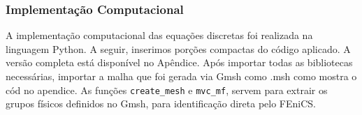 \subsubsection{Implementação Computacional}


A implementação computacional das equações discretas foi realizada na linguagem Python. A seguir, inserimos porções compactas do código aplicado. A versão completa está disponível no Apêndice. Após importar todas as bibliotecas necessárias, importar a malha que foi gerada via Gmsh como .msh como mostra o cód no apendice. As funções \texttt{create\_mesh} e \texttt{mvc\_mf}, servem para extrair os grupos físicos definidos no Gmsh, para identificação direta pelo FEniCS.
\begin{comment}

    \begin{lstlisting}[title=\phantom{}]
    def create_mesh(mesh, cell_type, prune_z=False):
        cells = mesh.get_cells_type(cell_type)
        cell_data = mesh.get_cell_data("gmsh:physical", cell_type)
        out_mesh = mio.Mesh(points=mesh.points, 
                   cells= {cell_type: cells},
                   cell_data={"name_to_read": [cell_data]})
        if prune_z:
            out_mesh.prune_z_0()
        return out_mesh
    
    def mvc_mf(mesh_from_file):
        line_mesh = create_mesh(mesh_from_file, 
                    "line", prune_z=True)
        mio.write("facet_mesh.xdmf", line_mesh)
        triangle_mesh = create_mesh(mesh_from_file,"triangle",
                        prune_z=True)
        mio.write("mesh.xdmf", triangle_mesh)
        mesh = Mesh()
    
        with XDMFFile("mesh.xdmf") as infile:
            infile.read(mesh)
            mvc = MeshValueCollection("size_t", mesh, 2)
    
        with XDMFFile("facet_mesh.xdmf") as infile:
            infile.read(mvc, "name_to_read")
            mf = MeshFunction("size_t", mesh, mvc)
        
        return mesh, mvc, mf
    \end{lstlisting}
    
\end{comment}

